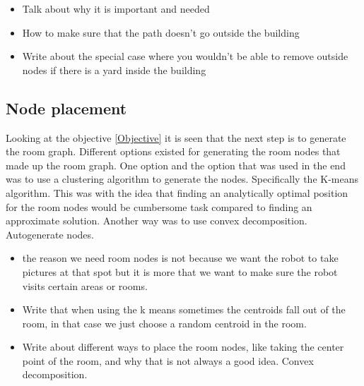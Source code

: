 \begin{itemize}
    \item Talk about why it is important and needed
    \item How to make sure that the path doesn't go outside the building
    \item Write about the special case where you wouldn't be able to remove outside nodes if there is a yard inside the building
\end{itemize}


\subsection{Node placement}
Looking at the objective \ref{Objective} it is seen that the next step is to generate the room graph. 
Different options existed for generating the room nodes that made up the room graph. One option and the option that was used in the end was to use a clustering algorithm to generate the nodes. Specifically the K-means algorithm.
This was with the idea that finding an analytically optimal position for the room nodes would be cumbersome task compared to finding an approximate solution. Another way was to use convex decomposition. Autogenerate nodes.

\begin{itemize}
    \item the reason we need room nodes is not because we want the robot to take pictures at that spot but it is more that we want to make sure the robot visits certain areas or rooms. 
    \item Write that when using the k means sometimes the centroids fall out of the room, in that case we just choose a random centroid in the room.
    \item Write about different ways to place the room nodes, like taking the center point of the room, and why that is not always a good idea. Convex decomposition.
\end{itemize}








